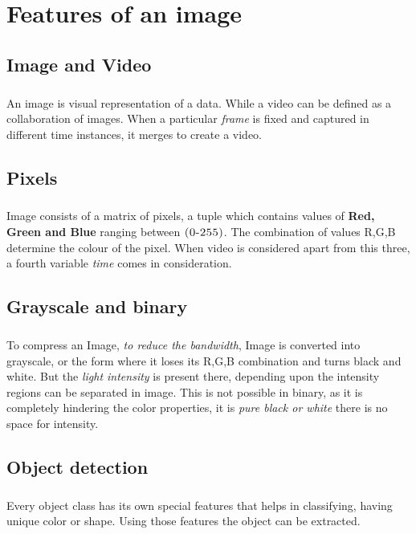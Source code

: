 \chapter{Features of an image}
\section{Image and Video}
\paragraph{} An image is visual representation of a data. While a video can be defined as a collaboration of images. When a particular \emph{frame} is fixed and captured in different time instances, it merges to create a video.
\section{Pixels}
\paragraph{} Image consists of a matrix of pixels, a tuple which contains values of \textbf{Red, Green and Blue} ranging between $ \textsc{(0-255)} $. The combination of values R,G,B determine the colour of the pixel. When video is considered apart from this three, a fourth variable \emph{time} comes in consideration.
\section{Grayscale and binary}
\paragraph{} To compress an Image, \emph{to reduce the bandwidth}, Image is converted into grayscale, or the form where it loses its R,G,B combination and turns black and white. But the \emph{light intensity} is present there, depending upon the intensity regions can be separated in image. This is not possible in binary, as it is completely hindering the color properties, it is \emph{pure black or white} there is no space for intensity.
\section{Object detection}
\paragraph{} Every object class has its own special features that helps in classifying, having unique color or shape. Using those features the object can be extracted.